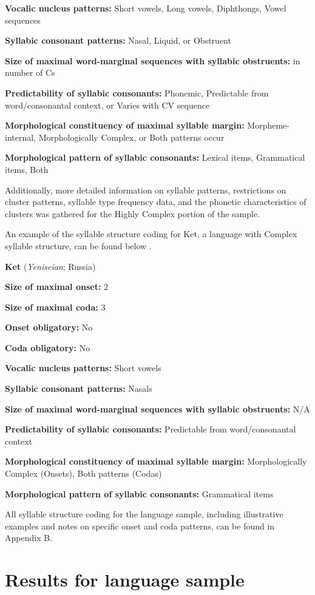 \textbf{Vocalic nucleus patterns:} Short vowels, Long vowels, Diphthongs, Vowel sequences

\textbf{Syllabic consonant patterns:} Nasal, Liquid, or Obstruent

\textbf{Size of maximal word-marginal sequences with syllabic obstruents:} in number of Cs

\textbf{Predictability of syllabic consonants:} Phonemic, Predictable from word/consonantal context, or Varies with CV sequence

\textbf{Morphological constituency of maximal syllable margin:} Morpheme-internal, Morphologically Complex, or Both patterns occur

\textbf{Morphological pattern of syllabic consonants:} Lexical items, Grammatical items, Both

  Additionally, more detailed information on syllable patterns, restrictions on cluster patterns, syllable type frequency data, and the phonetic characteristics of clusters was gathered for the Highly Complex portion of the sample.

  An example of the syllable structure coding for Ket, a language with Complex syllable structure, can be found below .

\ea\label{ex:3.11}
  \textbf{Ket} (\textit{Yeniseian}; Russia)

\textbf{Size of maximal onset:} 2

\textbf{Size of maximal coda:} 3

\textbf{Onset obligatory:} No

\textbf{Coda obligatory:} No

\textbf{Vocalic nucleus patterns:} Short vowels

\textbf{Syllabic consonant patterns:} Nasals

\textbf{Size of maximal word-marginal sequences with syllabic obstruents:} N/A

\textbf{Predictability of syllabic consonants:} Predictable from word/consonantal context

\textbf{Morphological constituency of maximal syllable margin:} Morphologically Complex (Onsets), Both patterns (Codas)

\textbf{Morphological pattern of syllabic consonants:} Grammatical items
\z

  All syllable structure coding for the language sample, including illustrative examples and notes on specific onset and coda patterns, can be found in Appendix B.

\section{Results for language sample}\label{sec:3.3}

